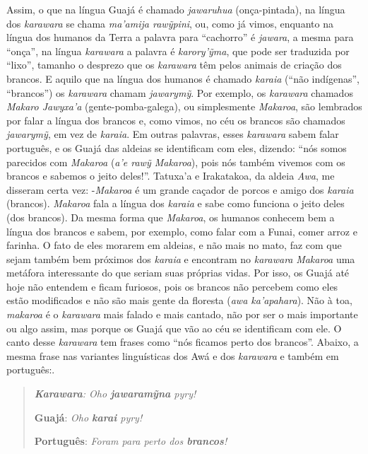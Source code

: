 Assim, o que na língua Guajá é chamado \emph{jawaruhua} (onça-pintada),
na língua dos \emph{karawara} se chama \emph{ma'amija rawỹpini}, ou,
como já vimos, enquanto na língua dos humanos da Terra a palavra para
``cachorro'' é \emph{jawara}, a mesma para ``onça'', na língua
\emph{karawara} a palavra é \emph{karory'ỹma}, que pode ser traduzida
por ``lixo'', tamanho o desprezo que os \emph{karawara} têm pelos
animais de criação dos brancos. E aquilo que na língua dos humanos é
chamado \emph{karaia} (``não indígenas'', ``brancos'') os
\emph{karawara} chamam \emph{jawarymỹ}. Por exemplo, os \emph{karawara}
chamados \emph{Makaro Jawyxa'a} (gente-pomba-galega), ou simplesmente
\emph{Makaroa}, são lembrados por falar a língua dos brancos e, como
vimos, no céu os brancos são chamados \emph{jawarymỹ}, em vez de
\emph{karaia}. Em outras palavras, esses \emph{karawara} sabem falar
português, e os Guajá das aldeias se identificam com eles, dizendo:
``nós somos parecidos com \emph{Makaroa} (\emph{a'e rawỹ Makaroa}), pois
nós também vivemos com os brancos e sabemos o jeito deles!''. Tatuxa'a e
Irakatakoa, da aldeia \emph{Awa}, me disseram certa vez: -\emph{Makaroa}
é um grande caçador de porcos e amigo dos \emph{karaia} (brancos).
\emph{Makaroa} fala a língua dos \emph{karaia} e sabe como funciona o
jeito deles (dos brancos). Da mesma forma que \emph{Makaroa}, os humanos
conhecem bem a língua dos brancos e sabem, por exemplo, como falar com a
Funai, comer arroz e farinha. O fato de eles morarem em aldeias, e não
mais no mato, faz com que sejam também bem próximos dos \emph{karaia} e
encontram no \emph{karawara} \emph{Makaroa} uma metáfora interessante do
que seriam suas próprias vidas. Por isso, os Guajá até hoje não entendem
e ficam furiosos, pois os brancos não percebem como eles estão
modificados e não são mais gente da floresta (\emph{awa ka'apahara}).
Não à toa, \emph{makaroa} é o \emph{karawara} mais falado e mais
cantado, não por ser o mais importante ou algo assim, mas porque os
Guajá que vão ao céu se identificam com ele. O canto desse
\emph{karawara} tem frases como ``nós ficamos perto dos brancos''.
Abaixo, a mesma frase nas variantes linguísticas dos Awá e dos
\emph{karawara} e também em português:.

\begin{quote}
\emph{\textbf{Karawara}: Oho \textbf{{jawaramỹna}} pyry!}

\textbf{Guajá}: \emph{Oho \textbf{{karai}} pyry!}

\textbf{Português}: \emph{Foram para perto dos \textbf{{brancos}}!}
\end{quote}

